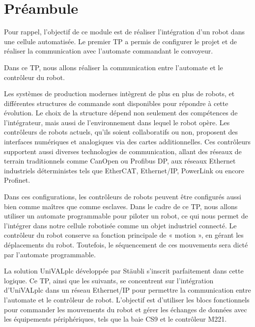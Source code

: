 \section*{Préambule}
Pour rappel, l'objectif de ce module est de réaliser l'intégration d'un robot dans une cellule automatisée. Le premier TP a permis de configurer le projet et de réaliser la communication avec l'automate commandant le convoyeur. 

Dans ce TP, nous allons réaliser la communication entre l'automate et le contrôleur du robot.


Les systèmes de production modernes intègrent de plus en plus de robots, et différentes structures de commande sont disponibles pour répondre à cette évolution. Le choix de la structure dépend non seulement des compétences de l'intégrateur, mais aussi de l'environnement dans lequel le robot opère. Les contrôleurs de robots actuels, qu'ils soient collaboratifs ou non, proposent des interfaces numériques et analogiques via des cartes additionnelles. Ces contrôleurs supportent aussi diverses technologies de communication, allant des réseaux de terrain traditionnels comme CanOpen ou Profibus DP, aux réseaux Ethernet industriels déterministes tels que EtherCAT, Ethernet/IP, PowerLink ou encore Profinet. 

Dans ces configurations, les contrôleurs de robots peuvent être configurés aussi bien comme maîtres que comme esclaves. Dans le cadre de ce TP, nous allons utiliser un automate programmable pour piloter un robot, ce qui nous permet de l’intégrer dans notre cellule robotisée comme un objet industriel connecté. Le contrôleur du robot conserve sa fonction principale de « motion », en gérant les déplacements du robot. Toutefois, le séquencement de ces mouvements sera dicté par l’automate programmable.

La solution UniVALplc développée par Stäubli s’inscrit parfaitement dans cette logique. Ce TP, ainsi que les suivants, se concentrent sur l’intégration d’UniVALplc dans un réseau Ethernet/IP pour permettre la communication entre l’automate et le contrôleur de robot. L’objectif est d’utiliser les blocs fonctionnels pour commander les mouvements du robot et gérer les échanges de données avec les équipements périphériques, tels que la baie CS9 et le contrôleur M221.

